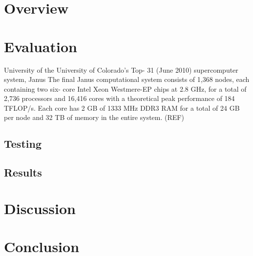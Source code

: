 \documentclass{article}
\begin{document}
\section{Overview}

\section{Evaluation}
University of the University of Colorado's Top-
31 (June 2010) supercomputer system, Janus
The final Janus computational
system consists of 1,368 nodes, each containing two six-
core Intel Xeon Westmere-EP chips at 2.8 GHz, for a total
of 2,736 processors and 16,416 cores with a theoretical
peak performance of 184 TFLOP/s. Each core has 2
GB of 1333 MHz DDR3 RAM for a total of 24 GB per
node and 32 TB of memory in the entire system. (REF)

\subsection{Testing}

\subsection{Results}

\section{Discussion}


\section{Conclusion}



\end{document}
